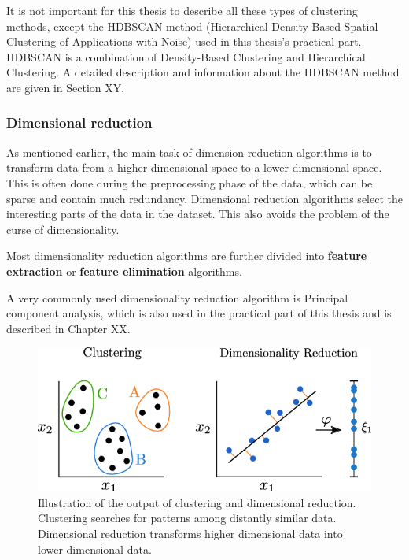 It is not important for this thesis to describe all these types of clustering methods, except the HDBSCAN method (Hierarchical Density-Based Spatial Clustering of Applications with Noise) used in this thesis's practical part. HDBSCAN is a combination of Density-Based Clustering and Hierarchical Clustering. A detailed description and information about the HDBSCAN method are given in Section XY.

\subsubsection{Dimensional reduction}


As mentioned earlier, the main task of dimension reduction algorithms is to transform data from a higher dimensional space to a lower-dimensional space\cite{ml-types2}. This is often done during the preprocessing phase of the data, which can be sparse and contain much redundancy. Dimensional reduction algorithms select the interesting parts of the data in the dataset. This also avoids the problem of the curse of dimensionality\cite{bellman1957dynamic}.

Most dimensionality reduction algorithms are further divided into \textbf{feature extraction} or \textbf{feature elimination} algorithms\cite{ml-types2}.

A very commonly used dimensionality reduction algorithm is Principal component analysis, which is also used in the practical part of this thesis and is described in Chapter XX.

\begin{figure}[ht]
    \centering
    \includegraphics[width=1\linewidth]{media/clustering-reduction.png}
    \caption{Illustration of the output of clustering and dimensional reduction. Clustering searches for patterns among distantly similar data. Dimensional reduction transforms higher dimensional data into lower dimensional data.\cite{clustering-reduction}}
    \label{fig:clustering-reduction}
\end{figure}

